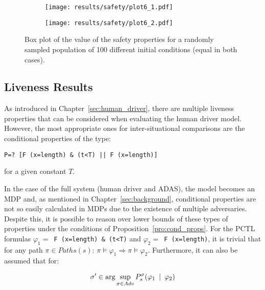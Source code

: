 \begin{figure}[H]
\centering
\begin{subfigure}{0.75\textwidth}
  \centering
  \texttt{[image: results/safety/plot6\_1.pdf]}
\end{subfigure}
\begin{subfigure}{0.75\textwidth}
  \centering
  \texttt{[image: results/safety/plot6\_2.pdf]}
\end{subfigure} 
\caption{Box plot of the value of the safety properties for a randomly sampled population of 100 different initial conditions (equal in both cases).}
\label{fig:plot6}
\end{figure}

\subsection{Liveness Results}
\label{sec:res_liveness}

As introduced in Chapter~\ref{sec:human_driver}, there are multiple liveness properties that can be considered when evaluating the human driver model. However, the most appropriate ones for inter-situational comparisons are the conditional properties of the type:

\begin{minipage}{\linewidth}
{\vspace{1em}
\begin{lstlisting}
P=? [F (x=length) & (t<T) || F (x=length)]
\end{lstlisting}
}
\end{minipage}

for a given constant $T$.

In the case of the full system (human driver and ADAS), the model becomes an MDP and, as mentioned in Chapter~\ref{sec:background}, conditional properties are not so easily calculated in MDPs due to the existence of multiple adversaries. Despite this, it is possible to reason over lower bounds of these types of properties under the conditions of Proposition~\ref{pro:cond_props}. For the PCTL formulas $\varphi_1 = $\texttt{ F (x=length) \& (t<T)} and $\varphi_2 = $\texttt{ F (x=length)}, it is trivial that for any path $\pi \in Paths(s)$: $\pi \models \varphi_1 \Rightarrow \pi \models \varphi_2$. Furthermore, it can also be assumed that for:

\begin{equation}
	\sigma' \in \arg\sup_{\sigma \in Adv} P^{\sigma}_s (\varphi_1 \:\mid\: \varphi_2)
\end{equation}

